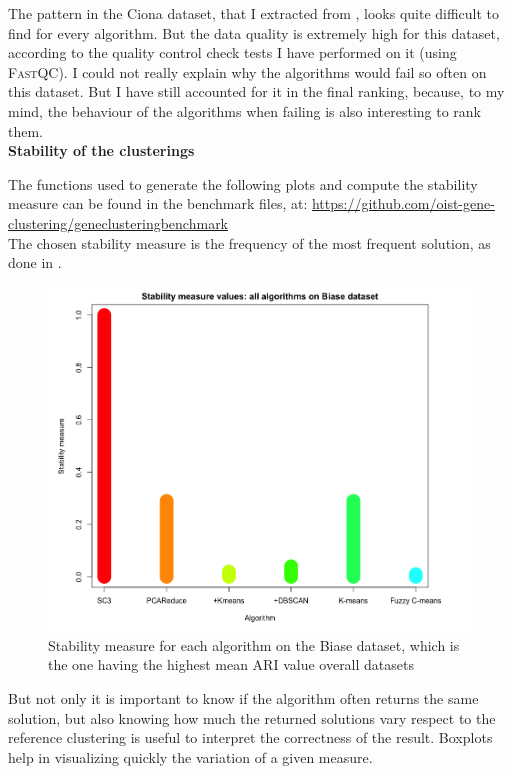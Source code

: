 \documentclass{report}
\begin{document}
{The pattern in the Ciona dataset\cite{suyama2016singlecell}, that I extracted from \cite{matsuoka2013transcriptome}, looks quite difficult to find for every algorithm. But the data quality is extremely high for this dataset, according to the quality control check tests I have performed on it (using \textsc{FastQC}\cite{andrews2010fastqc}). I could not really explain why the algorithms would fail so often on this dataset. But I have still accounted for it in the final ranking, because, to my mind, the behaviour of the algorithms when failing is also interesting to rank them.\\

\bigskip
\noindent \textbf{Stability of the clusterings}
\bigskip

The functions used to generate the following plots and compute the stability measure can be found in the benchmark files, at: {\url{https://github.com/oist-gene-clustering/geneclusteringbenchmark}}\\

The chosen stability measure is the frequency of the most frequent solution, as done in \cite{kiselev2016sc3}.

\begin{figure}[H]
\centering
\includegraphics[scale=0.4]{benchmark/stabilityOne.png}
\caption{Stability measure for each algorithm on the Biase dataset, which is the one having the highest mean ARI value overall datasets}
\label{stability}
\end{figure}

But not only it is important to know if the algorithm often returns the same solution, but also knowing how much the returned solutions vary respect to the reference clustering is useful to interpret the correctness of the result. Boxplots help in visualizing quickly the variation of a given measure. 

}
\end{document}

